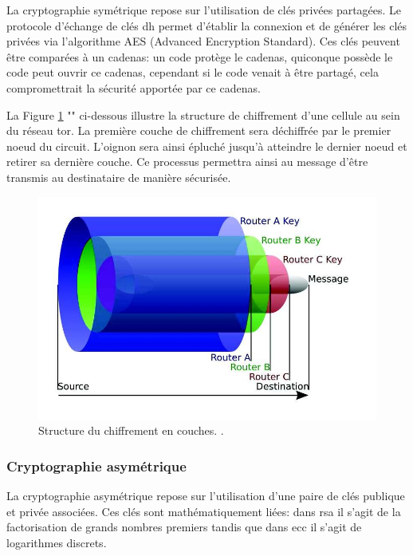 La cryptographie symétrique repose sur l'utilisation de clés privées partagées.
Le protocole d'échange de clés \acrlong{dh} permet d'établir la connexion et de générer les clés privées via l'algorithme AES (Advanced Encryption Standard).
Ces clés peuvent être comparées à un cadenas: un code protège le cadenas, quiconque possède le code peut ouvrir ce cadenas, cependant si le code venait à être partagé, cela compromettrait la sécurité apportée par ce cadenas.

La Figure \ref{fig:structure-chiffrement} "" ci-dessous illustre la structure de chiffrement d'une cellule au sein du réseau \acrshort{tor}.
La première couche de chiffrement sera déchiffrée par le premier noeud du circuit. 
L'oignon sera ainsi épluché jusqu'à atteindre le dernier noeud et retirer sa dernière couche.
Ce processus permettra ainsi au message d'être transmis au destinataire de manière sécurisée.

\begin{figure}[h!]
  \centering
  \includegraphics[width=0.7\linewidth]{Images/OR/Layers-of-the-Onion-source.png.jpeg}
  \caption{Structure du chiffrement en couches. \cite[Layers-of-the-Onion-source]{noauthor_layers---onion-sourcepng_nodate}.}
  \label{fig:structure-chiffrement}
\end{figure}

\subsubsection{Cryptographie asymétrique}\label{subsubsec:ca}

La cryptographie asymétrique repose sur l'utilisation d'une paire de clés publique et privée associées.
Ces clés sont mathématiquement liées: dans \acrshort{rsa} il s'agit de la factorisation de grands nombres premiers tandis que dans \acrshort{ecc} il s'agit de logarithmes discrets.

